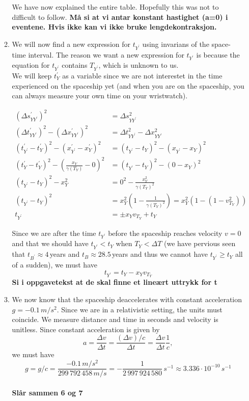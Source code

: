 \documentclass[a4paper,10pt,english]{article}
\begin{document}
\begin{enumerate}
\begin{enumerate}
We have now explained the entire table. Hopefully this was not to difficult to follow.
\textbf{Må si at vi antar konstant hastighet (a=0) i eventene. Hvis ikke kan vi ikke bruke lengdekontraksjon.}

\item We will now find a new expression for $t_{Y^{\prime}}$ using invarians of the space-time interval. The reason we want a new expression for $t_{Y^{\prime}}$ is because the equation for $t_{Y^{\prime}}$ contains $T_{Y^{\prime}}$, which is unknown to us. 
\\
We will keep $t^{\prime}_{Y}$ as a variable since we are not interestet in the time experienced on the spaceship yet (and when you are on the spaceship, you can always measure your own time on your wristwatch).

\begin{align*}
(\Delta s^{\prime}_{YY^{\prime}})^{2}&=\Delta s_{YY^{\prime}}^{2}\\
(\Delta t^{\prime}_{YY^{\prime}})^{2}-(\Delta x^{\prime}_{YY^{\prime}})^{2}&=\Delta t_{YY^{\prime}}^{2}-\Delta x_{YY^{\prime}}^{2}\\
\left(t^{\prime}_{Y^{\prime}}-t_{Y}^{\prime}\right)^{2}-\left(x^{\prime}_{Y^{\prime}}-x_{Y}^{\prime}\right)^{2}&=\left(t_{Y^{\prime}}-t_{Y}\right)^{2}-\left(x_{Y^{\prime}}-x_{Y}\right)^{2}\\
\left(t^{\prime}_{Y}-t_{Y}^{\prime}\right)^{2}-\left(\frac{x_{Y}}{\gamma(T_{Y})}-0\right)^{2}&=\left(t_{Y^{\prime}}-t_{Y}\right)^{2}-\left(0-x_{Y}\right)^{2}\\
\left(t_{Y^{\prime}}-t_{Y}\right)^{2}-x_{Y}^{2}&=0^{2}-\frac{x^{2}_{Y}}{\gamma(T_{Y})^{2}}\\
\left(t_{Y^{\prime}}-t_{Y}\right)^{2}&=x_{Y}^{2}\left(1-\frac{1}{\gamma(T_{Y})^{2}}\right)=x_{Y}^{2}\left(1-\left(1-v_{T_{Y}}^{2}\right)\right)\\
t_{Y^{\prime}}&=\pm x_{Y}v_{T_{Y}}+t_{Y}
\end{align*}

Since we are after the time $t_{Y^{\prime}}$ before the spaceship reaches velocity $v=0$ and that we should have $t_{Y^{\prime}}<t_{Y}$ when $T_{Y}<\Delta T$ (we have pervious seen that $t_{B^{\prime}}\approx4\,$years and $t_{B}\approx28.5\,$years and thus we cannot have $t_{Y^{\prime}}\geq t_{Y}$ all of a sudden), we must have \begin{equation}\label{eq:t_Y_mark}t_{Y^{\prime}}=t_{Y}-x_{Y}v_{T_{Y}}\end{equation}
\textbf{Si i oppgavetekst at de skal finne et lineært uttrykk for t}
\item We now know that the spaceship deaccelerates with constant acceleration $g=-0.1\,m/s^{2}$. Since we are in a relativistic setting, the units must coincide. We measure distance and time in seconds and velocity is unitless. Since constant acceleration is given by \[a=\frac{\Delta v}{\Delta t}=\frac{(\Delta v)/c}{\Delta t}=\frac{\Delta v}{\Delta t}\frac{1}{c},\] we must have \[g=g/c=\frac{-0.1\,m/s^{2}}{299\,792\,458\,m/s}=-\frac{1}{2\,997\,924\,580}\,s^{-1}\approx3.336\cdot10^{-10}\,s^{-1}\]
\\
\textbf{Slår sammen 6 og 7}
\\


\end{enumerate}
\end{enumerate}
\end{document}
